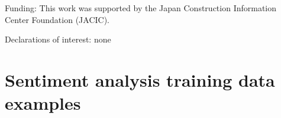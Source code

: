\documentclass[review]{elsarticle}
\begin{document}
\medskip

Funding: This work was supported by the Japan Construction Information Center Foundation (JACIC).

\medskip

Declarations of interest: none

\clearpage




\clearpage

\appendixpage
\appendix

\section{Sentiment analysis training data examples}
\end{document}

